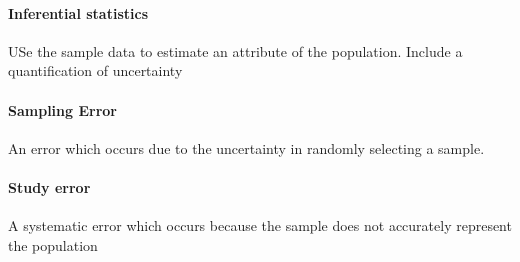       \paragraph{Inferential statistics} USe the sample data to estimate an
      attribute of the population. Include a quantification of uncertainty

      \paragraph{Sampling Error} An error which occurs due to the uncertainty
      in randomly selecting a sample.

      \paragraph{Study error} A systematic error which occurs because the
      sample does not accurately represent the population

